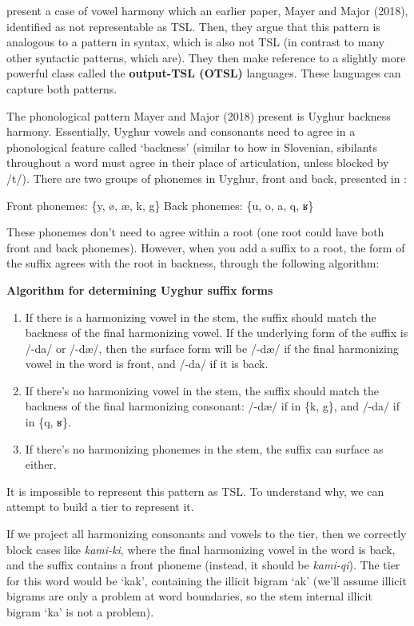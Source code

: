 
\citet{verbilhunter2026} present a case of vowel harmony which an earlier paper, Mayer and Major (2018), identified as not representable as TSL. Then, they argue that this pattern is analogous to a pattern in syntax, which is also not TSL (in contrast to many other syntactic patterns, which are). They then make reference to a slightly more powerful class called the \textbf{output-TSL (OTSL)} languages. These languages can capture both patterns.

The phonological pattern Mayer and Major (2018) present is Uyghur backness harmony. Essentially, Uyghur vowels and consonants need to agree in a phonological feature called `backness' (similar to how in Slovenian, sibilants throughout a word must agree in their place of articulation, unless blocked by /t/). There are two groups of phonemes in Uyghur, front and back, presented in \Next:

\pex \a Front phonemes: \{y, ø, æ, k, g\}
    \a Back phonemes: \{u, o, a, q, ʁ\}
\xe

These phonemes don't need to agree within a root (one root could have both front and back phonemes). However, when you add a suffix to a root, the form of the suffix agrees with the root in backness, through the following algorithm:

\ex \textbf{Algorithm for determining Uyghur suffix forms}
\begin{enumerate}
    \item If there is a harmonizing vowel in the stem, the suffix should match the backness of the final harmonizing vowel. If the underlying form of the suffix is /-da/ or /-dæ/, then the surface form will be /-dæ/ if the final harmonizing vowel in the word is front, and /-da/ if it is back.
    \item If there's no harmonizing vowel in the stem, the suffix should match the backness of the final harmonizing consonant: /-dæ/ if in \{k, g\}, and /-da/ if in \{q, ʁ\}.
    \item If there's no harmonizing phonemes in the stem, the suffix can surface as either.
\end{enumerate}
\xe

It is impossible to represent this pattern as TSL. To understand why, we can attempt to build a tier to represent it.

If we project all harmonizing consonants and vowels to the tier, then we correctly block cases like \textit{kami-ki}, where the final harmonizing vowel in the word is back, and the suffix contains a front phoneme (instead, it should be \textit{kami-qi}). The tier for this word would be `kak', containing the illicit bigram `ak' (we'll assume illicit bigrams are only a problem at word boundaries, so the stem internal illicit bigram `ka' is not a problem).

